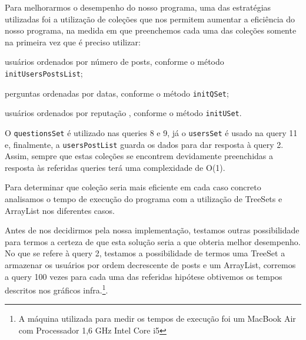 \documentclass[a4paper]{article}
\begin{document}
Para melhorarmos o desempenho do nosso programa, uma das estratégias utilizadas foi
a utilização de coleções que nos permitem aumentar a eficiência do nosso programa, na
medida em que preenchemos cada uma das coleções somente na primeira vez que é preciso
utilizar:
\begin{itemize}
\begin{item} usuários ordenados por número de posts, conforme o método \texttt{initUsersPostsList};\end{item}
\begin{item} perguntas ordenadas por datas, conforme o método \texttt{initQSet};\end{item}
\begin{item} usuários ordenados por reputação , conforme o método \texttt{initUSet}.\end{item}
\end{itemize}


O \texttt{questionsSet} é utilizado nas queries 8 e 9, já o \texttt{usersSet} é
usado na query 11 e, finalmente, a \texttt{usersPostList} guarda os dados para dar
resposta à query 2.
Assim, sempre que estas coleções se encontrem devidamente preenchidas
a resposta às referidas queries terá uma complexidade de O(1). \par
Para determinar que coleção seria mais eficiente em cada caso concreto analisamos
o tempo de execução do programa com a utilização de TreeSets e ArrayList nos diferentes
casos. \par
Antes de nos decidirmos pela nossa implementação, testamos outras possibilidade
para termos a certeza de que esta solução seria a que obteria melhor desempenho.
No que se refere à query 2, testamos a possibilidade de termos uma TreeSet a armazenar
os usuários por ordem decrescente de posts e um ArrayList, corremos a query 100 vezes
para cada uma das referidas hipótese obtivemos os tempos descritos nos gráficos
infra.\footnote{A máquina utilizada para medir os tempos de execução foi um
MacBook Air com Processador 1,6 GHz Intel Core i5}.
\end{document}
